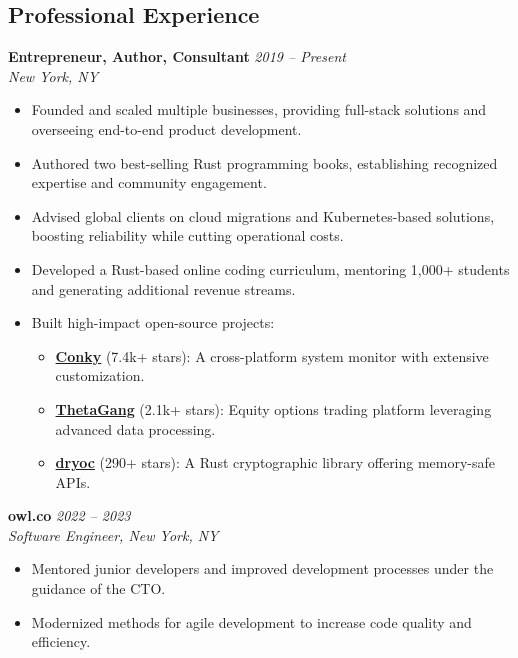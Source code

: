 \documentclass[margin,line]{resume}
\begin{document}
\begin{resume}
\vspace{10pt}

\section{Professional Experience}

\textbf{Entrepreneur, Author, Consultant} \hfill \textit{2019 -- Present}\\
\textit{New York, NY}
\begin{itemize}[leftmargin=0.5cm]
    \item Founded and scaled multiple businesses, providing full-stack solutions and overseeing end-to-end product development.
    \item Authored two best-selling Rust programming books, establishing recognized expertise and community engagement.
    \item Advised global clients on cloud migrations and Kubernetes-based solutions, boosting reliability while cutting operational costs.
    \item Developed a Rust-based online coding curriculum, mentoring 1,000+ students and generating additional revenue streams.
    \item Built high-impact open-source projects:
        \begin{itemize}
            \item \href{https://github.com/brndnmtthws/conky/}{\textbf{Conky}} (7.4k+ stars): A cross-platform system monitor with extensive customization.
            \item \href{https://github.com/brndnmtthws/thetagang/}{\textbf{ThetaGang}} (2.1k+ stars): Equity options trading platform leveraging advanced data processing.
            \item \href{https://github.com/brndnmtthws/dryoc/}{\textbf{dryoc}} (290+ stars): A Rust cryptographic library offering memory-safe APIs.
        \end{itemize}
\end{itemize}

\textbf{owl.co} \hfill \textit{2022 -- 2023}\\
\textit{Software Engineer, New York, NY}
\begin{itemize}[leftmargin=0.5cm]
    \item Mentored junior developers and improved development processes under the guidance of the CTO.
    \item Modernized methods for agile development to increase code quality and efficiency.
\end{itemize}


\end{resume}
\end{document}
